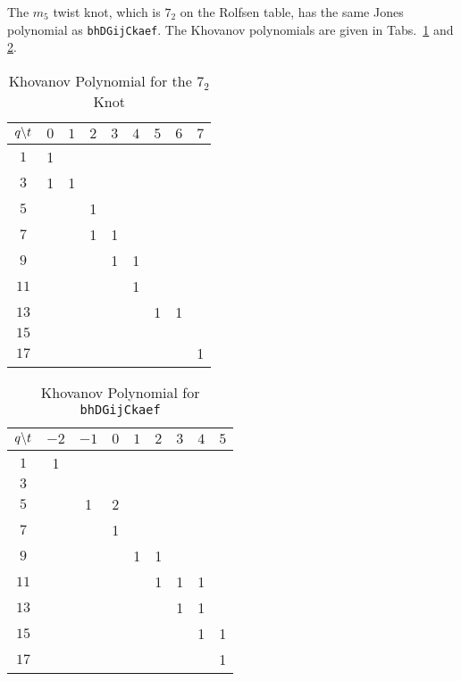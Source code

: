 \documentclass{article}
\theoremstyle{plain}
\begin{document}
        The $m_{5}$ twist knot, which is $7_{2}$ on the Rolfsen table, has the
        same Jones polynomial as \texttt{bhDGijCkaef}. The Khovanov polynomials
        are given in Tabs.~\ref{table:m_5_kho} and \ref{table:bhDGijCkaef_kho}.
        \begin{table}[H]
            \centering
            \begin{tabular}{| c | c | c | c | c | c | c | c | c |}
                \hline
                $q\symbol{92}t$&$0$&$1$&$2$&$3$&$4$&$5$&$6$&$7$\\
                \hline
                $1$&1&&&&&&&\\
                \hline
                $3$&1&1&&&&&&\\
                \hline
                $5$&&&1&&&&&\\
                \hline
                $7$&&&1&1&&&&\\
                \hline
                $9$&&&&1&1&&&\\
                \hline
                $11$&&&&&1&&&\\
                \hline
                $13$&&&&&&1&1&\\
                \hline
                $15$&&&&&&&&\\
                \hline
                $17$&&&&&&&&1\\
                \hline
            \end{tabular}
            \caption{Khovanov Polynomial for the $7_{2}$ Knot}
            \label{table:m_5_kho}
        \end{table}
        \begin{table}[H]
            \centering
            \begin{tabular}{| c | c | c | c | c | c | c | c | c |}
                \hline
                $q\symbol{92}t$&$-2$&$-1$&$0$&$1$&$2$&$3$&$4$&$5$\\
                \hline
                $1$&1&&&&&&&\\
                \hline
                $3$&&&&&&&&\\
                \hline
                $5$&&1&2&&&&&\\
                \hline
                $7$&&&1&&&&&\\
                \hline
                $9$&&&&1&1&&&\\
                \hline
                $11$&&&&&1&1&1&\\
                \hline
                $13$&&&&&&1&1&\\
                \hline
                $15$&&&&&&&1&1\\
                \hline
                $17$&&&&&&&&1\\
                \hline
            \end{tabular}
            \caption{Khovanov Polynomial for \texttt{bhDGijCkaef}}
            \label{table:bhDGijCkaef_kho}
        \end{table}
\end{document}
